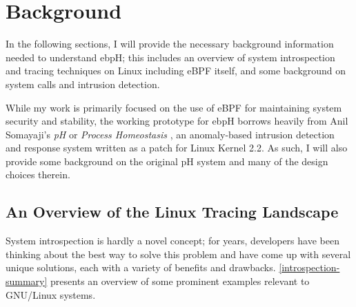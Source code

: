 \documentclass[
  12pt]{findlay}
\begin{document}
\hypertarget{background}{%
\section{Background}\label{background}}

In the following sections, I will provide the necessary background
information needed to understand ebpH; this includes an overview of
system introspection and tracing techniques on Linux including eBPF
itself, and some background on system calls and intrusion detection.

While my work is primarily focused on the use of eBPF for maintaining
system security and stability, the working prototype for ebpH borrows
heavily from Anil Somayaji's \emph{pH} or \emph{Process Homeostasis}
\autocite{soma02}, an anomaly-based intrusion detection and response
system written as a patch for Linux Kernel 2.2. As such, I will also
provide some background on the original pH system and many of the design
choices therein.

\hypertarget{an-overview-of-the-linux-tracing-landscape}{%
\subsection{An Overview of the Linux Tracing
Landscape}\label{an-overview-of-the-linux-tracing-landscape}}

\label{tracing-section}

System introspection is hardly a novel concept; for years, developers
have been thinking about the best way to solve this problem and have
come up with several unique solutions, each with a variety of benefits
and drawbacks. \autoref{introspection-summary} presents an overview of
some prominent examples relevant to GNU/Linux systems.
\end{document}
